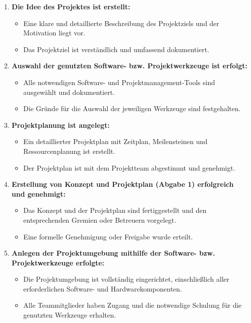 \begin{enumerate}
    \item \textbf{Die Idee des Projektes ist erstellt:}
    \begin{itemize}[label=--, itemsep=0pt, parsep=0pt]
        \item Eine klare und detaillierte Beschreibung des Projektziels und der Motivation liegt vor.
        \item Das Projektziel ist verständlich und umfassend dokumentiert.
    \end{itemize}

    \item \textbf{Auswahl der genutzten Software- bzw. Projektwerkzeuge ist erfolgt:}
    \begin{itemize}[label=--, itemsep=0pt, parsep=0pt]
        \item Alle notwendigen Software- und Projektmanagement-Tools sind ausgewählt und dokumentiert.
        \item Die Gründe für die Auswahl der jeweiligen Werkzeuge sind festgehalten.
    \end{itemize}

    \item \textbf{Projektplanung ist angelegt:}
    \begin{itemize}[label=--, itemsep=0pt, parsep=0pt]
        \item Ein detaillierter Projektplan mit Zeitplan, Meilensteinen und Ressourcenplanung ist erstellt.
        \item Der Projektplan ist mit dem Projektteam abgestimmt und genehmigt.
    \end{itemize}

    \item \textbf{Erstellung von Konzept und Projektplan (Abgabe 1) erfolgreich und genehmigt:}
    \begin{itemize}[label=--, itemsep=0pt, parsep=0pt]
        \item Das Konzept und der Projektplan sind fertiggestellt und den entsprechenden Gremien oder Betreuern vorgelegt.
        \item Eine formelle Genehmigung oder Freigabe wurde erteilt.
    \end{itemize}

    \item \textbf{Anlegen der Projektumgebung mithilfe der Software- bzw. Projektwerkzeuge erfolgte:}
    \begin{itemize}[label=--, itemsep=0pt, parsep=0pt]
        \item Die Projektumgebung ist vollständig eingerichtet, einschließlich aller erforderlichen Software- und Hardwarekomponenten.
        \item Alle Teammitglieder haben Zugang und die notwendige Schulung für die genutzten Werkzeuge erhalten.
    \end{itemize}


\end{enumerate}
